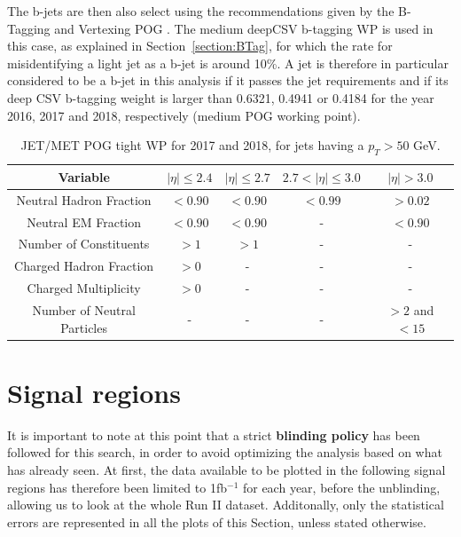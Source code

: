\documentclass[a4paper, 10pt, openright]{report}
\begin{document}
The b-jets are then also select using the recommendations given by the B-Tagging and Vertexing \ac{POG} \cite{BTagPOG}. The medium deepCSV b-tagging \ac{WP} is used in this case, as explained in Section~\ref{section:BTag}, for which the rate for misidentifying a light jet as a b-jet is around 10\%. A jet is therefore in particular considered to be a b-jet in this analysis if it passes the jet requirements and if its deep CSV b-tagging weight is larger than 0.6321, 0.4941 or 0.4184 for the year 2016, 2017 and 2018, respectively (medium \ac{POG} working point).

\begin{table}
\begin{center}
\begin{tabular}{ c|c|c|c|c } 
 \hline
 Variable & $|\eta| \leq 2.4$ & $|\eta| \leq 2.7$ & $2.7 < |\eta| \leq 3.0$ & $|\eta| > 3.0$ \\
\hline
Neutral Hadron Fraction & $< 0.90$ & $< 0.90$ & $< 0.99$ & $> 0.02$ \\
Neutral EM Fraction & $< 0.90$ & $< 0.90$ & - & $< 0.90$ \\
Number of Constituents & $> 1$ & $> 1$ & - & - \\
Charged Hadron Fraction & $> 0$ & - & - & - \\
Charged Multiplicity & $> 0$ & - & - & - \\
Number of Neutral Particles & - & - & - & $> 2$ and $< 15$ \\
\hline
\end{tabular}
\caption{JET/MET \ac{POG} tight \ac{WP} for 2017 and 2018, for jets having a $p_T > 50$ GeV.}
\label{table:JetSelPU}
\end{center}
\end{table}

\section{Signal regions} \label{section:SR}

It is important to note at this point that a strict \textbf{blinding policy} has been followed for this search, in order to avoid optimizing the analysis based on what has already seen. At first, the data available to be plotted in the following signal regions has therefore been limited to 1fb$^{-1}$ for each year, before the unblinding, allowing us to look at the whole Run II dataset. Additonally, only the statistical errors are represented in all the plots of this Section, unless stated otherwise.
\end{document}
